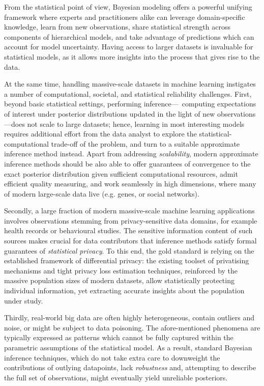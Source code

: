 From the statistical point of view, Bayesian modeling offers a powerful unifying framework where experts and practitioners alike can leverage domain-specific knowledge, learn from new observations, share statistical strength across components of hierarchical models, and take advantage of predictions which can account for model uncertainty. Having access to larger datasets is invaluable for statistical models, as it allows more insights into the process that gives rise to the data. 

At the same time, handling massive-scale datasets in machine learning instigates a number of computational, societal, and statistical reliability challenges. First, beyond basic statistical settings, performing inference---\ie~computing expectations of interest under posterior distributions updated in the light of new observations---does not scale to large datasets; hence, learning in most interesting models requires additional effort from the data analyst to explore the statistical-computational trade-off of the problem, and turn to a suitable approximate inference method instead. Apart from addressing \emph{scalability}, modern approximate inference methods should be also able to offer guarantees of convergence to the exact posterior distribution given sufficient computational resources, admit efficient quality measuring, and work seamlessly in high dimensions, where many of modern large-scale data live (e.g. genes, or social networks).

Secondly, a large fraction of modern massive-scale machine learning applications involves observations stemming from privacy-sensitive data domains, for example health records or behavioural studies. The sensitive information content of such sources makes crucial for data contributors that inference methods satisfy formal guarantees of \emph{statistical privacy}. To this end, the gold standard is relying on the established framework of differential privacy: the existing toolset of privatising mechanisms and tight privacy loss estimation techniques, reinforced by the massive population sizes of modern datasets, allow statistically protecting individual information, yet extracting accurate insights about the population under study.

Thirdly, real-world big data are often highly heterogeneous, contain outliers and noise, or might be subject to data poisoning. The afore-mentioned phenomena are typically expressed as patterns which cannot be fully captured within the parametric assumptions of the statistical model. As a result, standard Bayesian inference techniques, which do not take extra care to downweight the contributions of outlying datapoints, lack \emph{robustness} and, attempting to describe the full set of observations, might eventually yield unreliable posteriors. 

